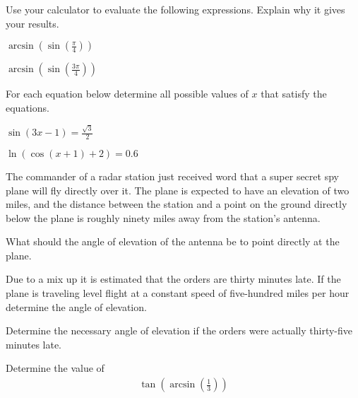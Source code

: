 \begin{problem}
\item Use your calculator to evaluate the following
  expressions. Explain why it gives your results.
  \begin{subproblem}
    \item $\arcsin\left(\sin\left(\frac{\pi}{4}\right)\right)$
      \vfill
    \item $\arcsin\left(\sin\left(\frac{3\pi}{4}\right)\right)$
      \vfill
  \end{subproblem}

  \clearpage

  \item For each equation below determine all possible values of $x$
    that satisfy the equations.
    \begin{subproblem}
      \item ${\displaystyle \sin(3x-1)=\frac{\sqrt{3}}{2}}$
        \vfill
      \item ${\displaystyle \ln(\cos(x+1)+2)=0.6}$
        \vfill
    \end{subproblem}

  \clearpage

\item The commander of a radar station just received word that a super secret spy plane
  will fly directly over it. The plane is expected to have an elevation of
  two miles, and the distance between the station and a point on the ground
  directly below the plane is roughly ninety miles away from the station's antenna.
  \begin{subproblem}
  \item What should the angle of elevation of the antenna be to point directly
    at the plane.
    \vfill
  \item Due to a mix up it is estimated that the orders are thirty minutes late.
    If the plane is traveling level flight at a constant speed of
    five-hundred miles per hour determine the angle of elevation.
    \vfill
  \item Determine the necessary angle of elevation if the orders were actually
    thirty-five minutes late.
    \vfill
  \end{subproblem}

  \vfill

  \clearpage

\item Determine the value of
  \begin{eqnarray*}
    \tan\left(\arcsin\left(\frac{1}{3}\right)\right)
  \end{eqnarray*}


\end{problem}

